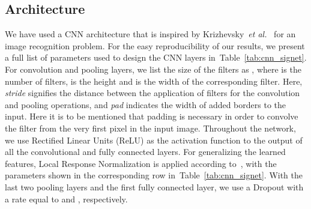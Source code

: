 \documentclass[times,twocolumn,final]{elsarticle}
\newcommand{\etal}{\textit{et al.}}
\newcommand{\tab}[1]{Table~\ref{#1}}
\begin{document}
\subsection{Architecture}
\label{ss:arch}
We have used a CNN architecture that is inspired by Krizhevsky~\etal~\cite{Krizhevsky2012} for an image recognition problem. For the easy reproducibility of our results, we present a full list of parameters used to design the CNN layers in~\tab{tab:cnn_signet}. For convolution and pooling layers, we list the size of the filters as , where  is the number of filters,  is the height and  is the width of the corresponding filter. Here, \emph{stride} signifies the distance between the application of filters for the convolution and pooling operations, and \emph{pad} indicates the width of added borders to the input. Here it is to be mentioned that padding is necessary in order to convolve the filter from the very first pixel in the input image. Throughout the network, we use Rectified Linear Units (ReLU) as the activation function to the output of all the convolutional and fully connected layers. For generalizing the learned features, Local Response Normalization is applied according to~\cite{Krizhevsky2012}, with the parameters shown in the corresponding row in~\tab{tab:cnn_signet}. With the last two pooling layers and the first fully connected layer, we use a Dropout with a rate equal to  and , respectively.

\begin{table}[ht]
\caption{Overview of the constituting CNNs}
\label{tab:cnn_signet}
\begin{center}
\end{center}
\end{table}
\end{document}
